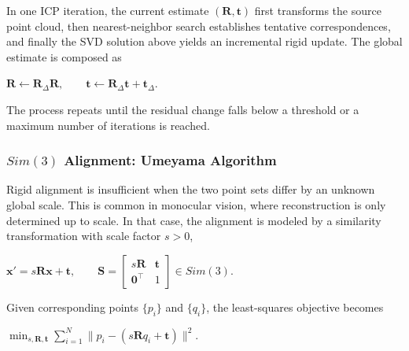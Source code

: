 In one ICP iteration, the current estimate $(\mathbf{R},\mathbf{t})$ first transforms the source point cloud, then nearest-neighbor search establishes tentative correspondences, and finally the SVD solution above yields an incremental rigid update. The global estimate is composed as
\begin{center}
    $\displaystyle \mathbf{R} \leftarrow \mathbf{R}_\Delta \mathbf{R},\qquad \mathbf{t} \leftarrow \mathbf{R}_\Delta \mathbf{t} + \mathbf{t}_\Delta.$
\end{center}
The process repeats until the residual change falls below a threshold or a maximum number of iterations is reached.

\subsubsection*{\boldmath$Sim(3)$ Alignment: Umeyama Algorithm}
Rigid alignment is insufficient when the two point sets differ by an unknown global scale. This is common in monocular vision, where reconstruction is only determined up to scale. In that case, the alignment is modeled by a similarity transformation with scale factor $s>0$,
\begin{center}
    $\displaystyle \mathbf{x}' = s\mathbf{R}\mathbf{x}+\mathbf{t}, \qquad \mathbf{S}=
    \begin{bmatrix}
    s\mathbf{R} & \mathbf{t} \\
    \mathbf{0}^\top & 1
    \end{bmatrix}\in Sim(3).$
\end{center}
Given corresponding points $\{p_i\}$ and $\{q_i\}$, the least-squares objective becomes
\begin{center}
    $\displaystyle \min_{s,\mathbf{R},\mathbf{t}} \sum_{i=1}^{N}\|p_i-(s\mathbf{R}q_i+\mathbf{t})\|^2.$
\end{center}

